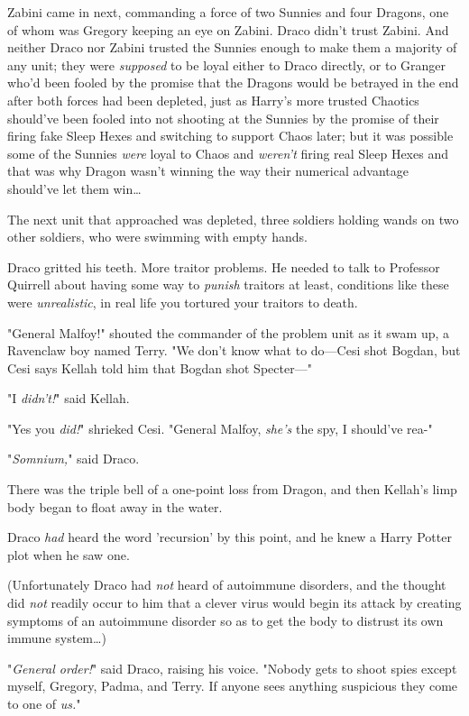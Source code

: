 Zabini came in next, commanding a force of two Sunnies and four Dragons, one of 
whom was Gregory keeping an eye on Zabini. Draco didn't trust Zabini. And 
neither Draco nor Zabini trusted the Sunnies enough to make them a majority of 
any unit; they were \emph{supposed} to be loyal either to Draco directly, or to 
Granger who'd been fooled by the promise that the Dragons would be betrayed in 
the end after both forces had been depleted, just as Harry's more trusted 
Chaotics should've been fooled into not shooting at the Sunnies by the promise 
of their firing fake Sleep Hexes and switching to support Chaos later; but it 
was possible some of the Sunnies \emph{were} loyal to Chaos and \emph{weren't} 
firing real Sleep Hexes and that was why Dragon wasn't winning the way their 
numerical advantage should've let them win{\ldots}

The next unit that approached was depleted, three soldiers holding wands on two 
other soldiers, who were swimming with empty hands.

Draco gritted his teeth. More traitor problems. He needed to talk to Professor 
Quirrell about having some way to \emph{punish} traitors at least, conditions 
like these were \emph{unrealistic}, in real life you tortured your traitors to 
death.

"General Malfoy!" shouted the commander of the problem unit as it swam up, a 
Ravenclaw boy named Terry. "We don't know what to do---Cesi shot Bogdan, but 
Cesi says Kellah told him that Bogdan shot Specter---"

"I \emph{didn't!}" said Kellah.

"Yes you \emph{did!}" shrieked Cesi. "General Malfoy, \emph{she's} the spy, I 
should've rea-"

"\emph{Somnium,}" said Draco.

There was the triple bell of a one-point loss from Dragon, and then Kellah's 
limp body began to float away in the water.

Draco \emph{had} heard the word 'recursion' by this point, and he knew a Harry 
Potter plot when he saw one.

(Unfortunately Draco had \emph{not} heard of autoimmune disorders, and the 
thought did \emph{not} readily occur to him that a clever virus would begin its 
attack by creating symptoms of an autoimmune disorder so as to get the body to 
distrust its own immune system{\ldots})

"\emph{General order!}" said Draco, raising his voice. "Nobody gets to shoot 
spies except myself, Gregory, Padma, and Terry. If anyone sees anything 
suspicious they come to one of \emph{us.}"


